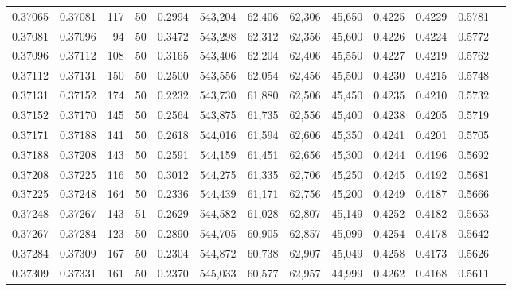 \begin{tabular}{rrrrrrrrrrrrr}
0.37065 & 0.37081 &   117 &  50 &                                     0.2994 & 543,204 &  62,406 &  62,306 &  45,650 & 0.4225 & 0.4229 & 0.5781 \\
0.37081 & 0.37096 &    94 &  50 &                                     0.3472 & 543,298 &  62,312 &  62,356 &  45,600 & 0.4226 & 0.4224 & 0.5772 \\
0.37096 & 0.37112 &   108 &  50 &                                     0.3165 & 543,406 &  62,204 &  62,406 &  45,550 & 0.4227 & 0.4219 & 0.5762 \\
0.37112 & 0.37131 &   150 &  50 &                                     0.2500 & 543,556 &  62,054 &  62,456 &  45,500 & 0.4230 & 0.4215 & 0.5748 \\
0.37131 & 0.37152 &   174 &  50 &                                     0.2232 & 543,730 &  61,880 &  62,506 &  45,450 & 0.4235 & 0.4210 & 0.5732 \\
0.37152 & 0.37170 &   145 &  50 &                                     0.2564 & 543,875 &  61,735 &  62,556 &  45,400 & 0.4238 & 0.4205 & 0.5719 \\
0.37171 & 0.37188 &   141 &  50 &                                     0.2618 & 544,016 &  61,594 &  62,606 &  45,350 & 0.4241 & 0.4201 & 0.5705 \\
0.37188 & 0.37208 &   143 &  50 &                                     0.2591 & 544,159 &  61,451 &  62,656 &  45,300 & 0.4244 & 0.4196 & 0.5692 \\
0.37208 & 0.37225 &   116 &  50 &                                     0.3012 & 544,275 &  61,335 &  62,706 &  45,250 & 0.4245 & 0.4192 & 0.5681 \\
0.37225 & 0.37248 &   164 &  50 &                                     0.2336 & 544,439 &  61,171 &  62,756 &  45,200 & 0.4249 & 0.4187 & 0.5666 \\
0.37248 & 0.37267 &   143 &  51 &                                     0.2629 & 544,582 &  61,028 &  62,807 &  45,149 & 0.4252 & 0.4182 & 0.5653 \\
0.37267 & 0.37284 &   123 &  50 &                                     0.2890 & 544,705 &  60,905 &  62,857 &  45,099 & 0.4254 & 0.4178 & 0.5642 \\
0.37284 & 0.37309 &   167 &  50 &                                     0.2304 & 544,872 &  60,738 &  62,907 &  45,049 & 0.4258 & 0.4173 & 0.5626 \\
0.37309 & 0.37331 &   161 &  50 &                                     0.2370 & 545,033 &  60,577 &  62,957 &  44,999 & 0.4262 & 0.4168 & 0.5611 \\

\end{tabular}
